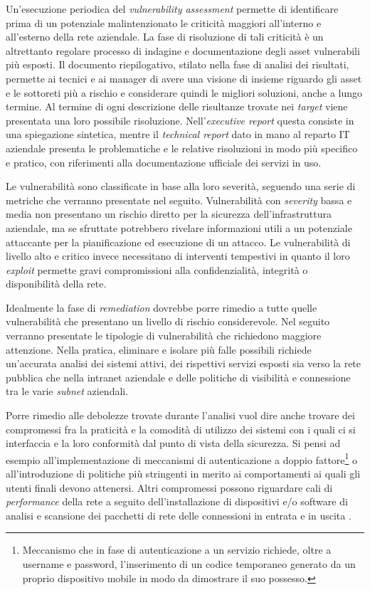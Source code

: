 \documentclass[target=bach,aauheader=]{thud}
\begin{document}
Un’esecuzione periodica del \textit{vulnerability assessment} permette di identificare prima di un potenziale malintenzionato le criticità maggiori all’interno e all’esterno della rete aziendale. La fase di risoluzione di tali criticità è un altrettanto regolare processo di indagine e documentazione degli asset vulnerabili più esposti. Il documento riepilogativo, stilato nella fase di analisi dei risultati, permette ai tecnici e ai manager di avere una visione di insieme riguardo gli asset e le sottoreti più a rischio e considerare quindi le migliori soluzioni, anche a lungo termine. Al termine di ogni descrizione delle risultanze trovate nei \textit{target} viene presentata una loro possibile risoluzione. Nell’\textit{executive report} questa consiste in una spiegazione sintetica, mentre il \textit{technical report} dato in mano al reparto IT aziendale presenta le problematiche e le relative risoluzioni in modo più specifico e pratico, con riferimenti alla documentazione ufficiale dei servizi in uso.

Le vulnerabilità sono classificate in base alla loro severità, seguendo una serie di metriche che verranno presentate nel seguito. Vulnerabilità con \textit{severity} bassa e media non presentano un rischio diretto per la sicurezza dell’infrastruttura aziendale, ma se sfruttate potrebbero rivelare informazioni utili a un potenziale attaccante per la pianificazione ed esecuzione di un attacco. Le vulnerabilità di livello alto e critico invece necessitano di interventi tempestivi in quanto il loro \textit{exploit} permette gravi compromissioni alla confidenzialità, integrità o disponibilità della rete.

Idealmente la fase di \textit{remediation} dovrebbe porre rimedio a tutte quelle vulnerabilità che presentano un livello di rischio considerevole. Nel seguito verranno presentate le tipologie di vulnerabilità che richiedono maggiore attenzione. Nella pratica, eliminare e isolare più falle possibili richiede un’accurata analisi dei sistemi attivi, dei rispettivi servizi esposti sia verso la rete pubblica che nella intranet aziendale e delle politiche di visibilità e connessione tra le varie \textit{subnet} aziendali.

Porre rimedio alle debolezze trovate durante l’analisi vuol dire anche trovare dei compromessi fra la praticità e la comodità di utilizzo dei sistemi con i quali ci si interfaccia e la loro conformità dal punto di vista della sicurezza. Si pensi ad esempio all’implementazione di meccanismi di autenticazione a doppio fattore\footnote{Meccanismo che in fase di autenticazione a un servizio richiede, oltre a username e password, l'inserimento di un codice temporaneo generato da un proprio dispositivo mobile in modo da dimostrare il suo possesso.} o all’introduzione di politiche più stringenti in merito ai comportamenti ai quali gli utenti finali devono attenersi. Altri compromessi possono riguardare cali di \textit{performance} della rete a seguito dell’installazione di dispositivi e/o software di analisi e scansione dei pacchetti di rete delle connessioni in entrata e in uscita \cite{remediation}.
\end{document}

